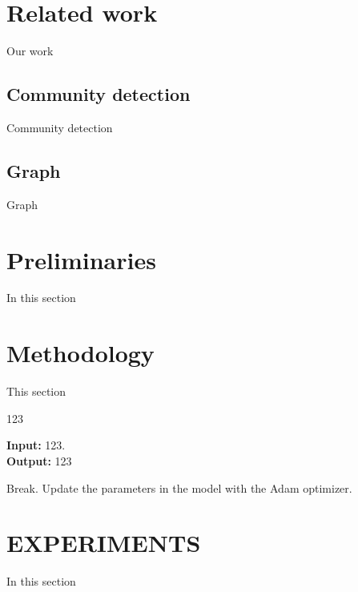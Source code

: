 \documentclass[a4paper,fleqn]{cas-dc}
\begin{document}
\begin{sloppypar}
	\section{Related work}
	\label{Related_work}
	\par{
		Our work
	}

	\subsection{Community detection}
	\par{
		Community detection 
	}

	\subsection{Graph}

	\par{
		Graph
	}



	\section{Preliminaries}
	\label{Preliminaries}
	\par{
		In this section
	}


	\section{Methodology}
	\label{Methodology}
	\par{
		This section 
	}


	\begin{algorithm}[ht]
		\caption{123}
		\label{alg:1}
		\hspace*{0.02in} {\bf Input:}
		123.\\
		\hspace*{0.02in} {\bf Output:}
		123
		\begin{algorithmic}[1]
			\EndIf
			\State Break.
			\EndIf
			\State Update the parameters in the model with the Adam optimizer.
			\EndFor
			\State {}
		\end{algorithmic}
	\end{algorithm}


	\section{EXPERIMENTS}
	\label{EXPERIMENTS}
	\par{
		In this section
	}


\end{sloppypar}
\end{document}
